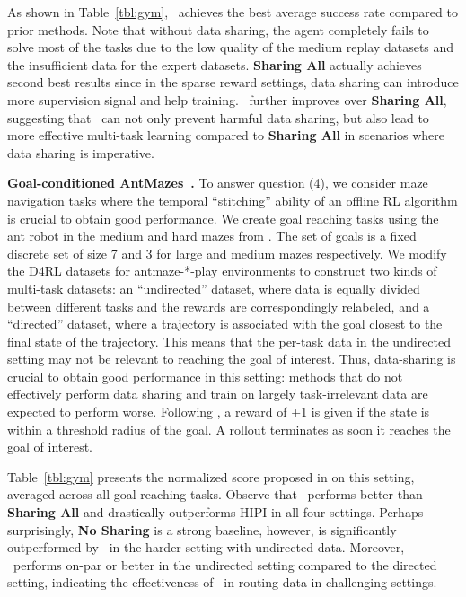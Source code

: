 As shown in Table~\ref{tbl:gym}, \methodname\ achieves the best average success rate compared to prior methods. Note that without data sharing, the agent completely fails to solve most of the tasks due to the low quality of the medium replay datasets and the insufficient data for the expert datasets. \textbf{Sharing All} actually achieves second best results since in the sparse reward settings, data sharing can introduce more supervision signal and help training. \methodname\ further improves over \textbf{Sharing All}, suggesting that \methodname\ can not only prevent harmful data sharing, but also lead to more effective multi-task learning compared to \textbf{Sharing All} in scenarios where data sharing is imperative.

\textbf{Goal-conditioned AntMazes~\citep{fu2020d4rl}.} To answer question (4), we consider maze navigation tasks where the temporal ``stitching'' ability of an offline RL algorithm is crucial to obtain good performance. We create goal reaching tasks using the ant robot in the medium and hard mazes from \citet{fu2020d4rl}. The set of goals is a fixed discrete set of size 7 and 3 for large and medium mazes respectively. We modify the D4RL datasets for antmaze-*-play environments to construct two kinds of multi-task datasets: an ``undirected'' dataset, where data is equally divided between different tasks and the rewards are correspondingly relabeled, and a ``directed'' dataset, where a trajectory is associated with the goal closest to the final state of the trajectory. This means that the per-task data in the undirected setting may not be relevant to reaching the goal of interest. Thus, data-sharing is crucial to obtain good performance in this setting: methods that do not effectively perform data sharing and train on largely task-irrelevant data are expected to perform worse. Following \citep{fu2020d4rl}, a reward of +1 is given if the state is within a threshold radius of the goal. A rollout terminates as soon it reaches the goal of interest. 

Table~\ref{tbl:gym} presents the normalized score proposed in \citep{fu2020d4rl} on this setting, averaged across all goal-reaching tasks. Observe that \methodname\ performs better than \textbf{Sharing All} and drastically outperforms HIPI in all four settings. Perhaps surprisingly, \textbf{No Sharing} is a strong baseline, however, is significantly outperformed by \methodname\ in the harder setting with undirected data. Moreover, \methodname\ performs on-par or better in the undirected setting compared to the directed setting, indicating the effectiveness of \methodname\ in routing data in challenging settings. 


